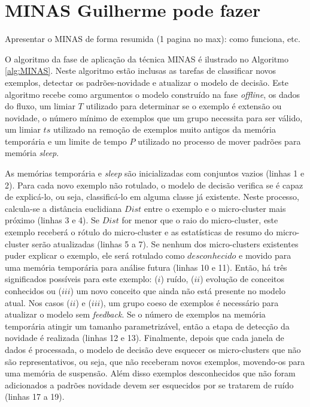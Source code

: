 \section{MINAS {\color{red} Guilherme pode fazer}}
\label{sec:minas}


Apresentar o MINAS de forma resumida (1 pagina no max): como funciona, etc. 

O algoritmo da fase de aplicação da técnica MINAS é ilustrado no Algoritmo \ref{alg:MINAS}. Neste algoritmo estão inclusas as tarefas de classificar novos exemplos, detectar os padrões-novidade e atualizar o modelo de decisão. Este algoritmo recebe como argumentos o modelo construído na fase \textit{offline}, os dados do fluxo, um limiar $T$ utilizado para determinar se o exemplo é extensão ou novidade, o número mínimo de exemplos que um grupo necessita para ser válido, um limiar $ts$ utilizado na remoção de exemplos muito antigos da memória temporária e um limite de tempo $P$ utilizado no processo de mover padrões para memória \textit{sleep}.


As memórias temporária e \textit{sleep} são inicializadas com conjuntos vazios (linhas 1 e 2). Para cada novo exemplo não rotulado, o modelo de decisão verifica se é capaz de explicá-lo, ou seja, classificá-lo em alguma classe já existente. Neste processo, calcula-se a distância euclidiana $Dist$ entre o exemplo e o micro-cluster mais próximo (linhas 3 e 4). Se $Dist$ for menor que o raio do micro-cluster, este exemplo receberá o rótulo do micro-cluster e as estatísticas de resumo do micro-cluster serão atualizadas (linhas 5 a 7). Se nenhum dos micro-clusters existentes puder explicar o exemplo, ele será rotulado como $desconhecido$ e movido para uma memória temporária para análise futura (linhas 10 e 11). Então, há três significados possíveis para este exemplo: ($i$) ruído, ($ii$) evolução de conceitos conhecidos ou ($iii$) um novo conceito que ainda não está presente no modelo atual. Nos casos ($ii$) e ($iii$), um grupo coeso de exemplos é necessário para atualizar o modelo sem \textit{feedback}. Se o número de exemplos na memória temporária atingir um tamanho parametrizável, então a etapa de detecção da novidade é realizada (linhas 12 e 13). Finalmente, depois que cada janela de dados é processada, o modelo de decisão deve esquecer os micro-clusters que não são representativos, ou seja, que não receberam novos exemplos, movendo-os para uma memória de suspensão. Além disso exemplos desconhecidos que não foram adicionados a padrões novidade devem ser esquecidos por se tratarem de ruído (linhas 17 a 19).


